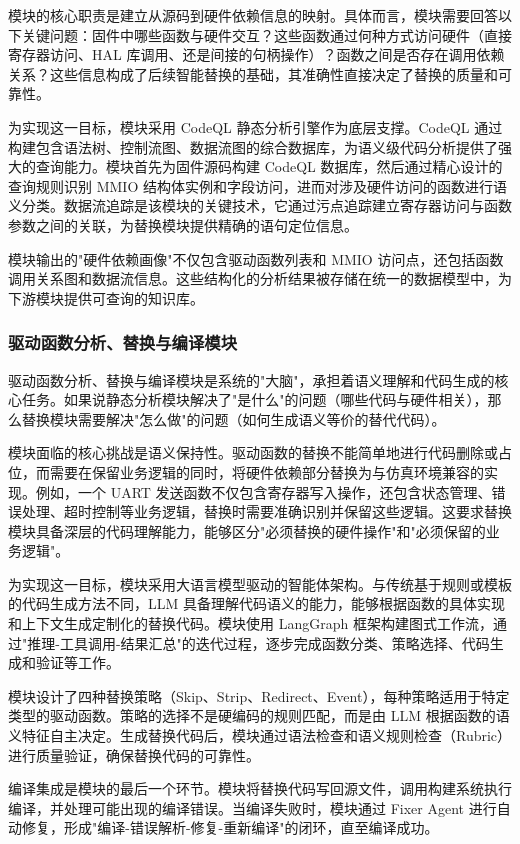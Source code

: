 模块的核心职责是建立从源码到硬件依赖信息的映射。具体而言，模块需要回答以下关键问题：固件中哪些函数与硬件交互？这些函数通过何种方式访问硬件（直接寄存器访问、HAL 库调用、还是间接的句柄操作）？函数之间是否存在调用依赖关系？这些信息构成了后续智能替换的基础，其准确性直接决定了替换的质量和可靠性。

为实现这一目标，模块采用 CodeQL 静态分析引擎作为底层支撑。CodeQL 通过构建包含语法树、控制流图、数据流图的综合数据库，为语义级代码分析提供了强大的查询能力。模块首先为固件源码构建 CodeQL 数据库，然后通过精心设计的查询规则识别 MMIO 结构体实例和字段访问，进而对涉及硬件访问的函数进行语义分类。数据流追踪是该模块的关键技术，它通过污点追踪建立寄存器访问与函数参数之间的关联，为替换模块提供精确的语句定位信息。

模块输出的"硬件依赖画像"不仅包含驱动函数列表和 MMIO 访问点，还包括函数调用关系图和数据流信息。这些结构化的分析结果被存储在统一的数据模型中，为下游模块提供可查询的知识库。

\subsubsection{驱动函数分析、替换与编译模块}

驱动函数分析、替换与编译模块是系统的"大脑"，承担着语义理解和代码生成的核心任务。如果说静态分析模块解决了"是什么"的问题（哪些代码与硬件相关），那么替换模块需要解决"怎么做"的问题（如何生成语义等价的替代代码）。

模块面临的核心挑战是语义保持性。驱动函数的替换不能简单地进行代码删除或占位，而需要在保留业务逻辑的同时，将硬件依赖部分替换为与仿真环境兼容的实现。例如，一个 UART 发送函数不仅包含寄存器写入操作，还包含状态管理、错误处理、超时控制等业务逻辑，替换时需要准确识别并保留这些逻辑。这要求替换模块具备深层的代码理解能力，能够区分"必须替换的硬件操作"和"必须保留的业务逻辑"。

为实现这一目标，模块采用大语言模型驱动的智能体架构。与传统基于规则或模板的代码生成方法不同，LLM 具备理解代码语义的能力，能够根据函数的具体实现和上下文生成定制化的替换代码。模块使用 LangGraph 框架构建图式工作流，通过"推理-工具调用-结果汇总"的迭代过程，逐步完成函数分类、策略选择、代码生成和验证等工作。

模块设计了四种替换策略（Skip、Strip、Redirect、Event），每种策略适用于特定类型的驱动函数。策略的选择不是硬编码的规则匹配，而是由 LLM 根据函数的语义特征自主决定。生成替换代码后，模块通过语法检查和语义规则检查（Rubric）进行质量验证，确保替换代码的可靠性。

编译集成是模块的最后一个环节。模块将替换代码写回源文件，调用构建系统执行编译，并处理可能出现的编译错误。当编译失败时，模块通过 Fixer Agent 进行自动修复，形成"编译-错误解析-修复-重新编译"的闭环，直至编译成功。

